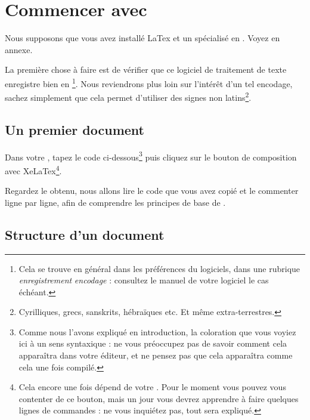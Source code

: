 \chapter{Commencer avec }

\begin{prealable}
Nous supposons que vous avez installé LaTex et un  spécialisé en . Voyez en annexe.

La première chose à faire est de vérifier que ce logiciel de traitement de texte enregistre bien en \footnote{Cela se trouve en général dans les préférences du logiciels, dans une rubrique \emph{enregistrement} \emph{encodage} : consultez le manuel de votre logiciel le cas échéant.}. Nous reviendrons plus loin sur l'intérêt d'un tel encodage, sachez simplement que cela permet d'utiliser des signes non latins\footnote{Cyrilliques, grecs, sanskrits, hébraïques etc. Et même extra-terrestres.}.

\end{prealable}

\section{Un premier document}

Dans votre , tapez le code ci-dessous\footnote{Comme nous l'avons expliqué en introduction, la coloration que vous voyiez ici à un sens syntaxique : ne vous préoccupez pas de savoir comment cela apparaîtra dans votre éditeur, et ne pensez pas que cela apparaîtra comme cela une fois compilé.} puis cliquez sur le bouton de composition avec XeLaTex\footnote{Cela encore une fois dépend de votre . Pour le moment vous pouvez vous contenter de ce bouton, mais un jour vous devrez apprendre à faire quelques lignes de commandes : ne vous inquiétez pas, tout sera expliqué.}.


Regardez le  obtenu, nous allons lire le code que vous avez copié et le commenter ligne par ligne, afin de comprendre les principes de base de .
\FloatBarrier

\section{Structure d'un document }

